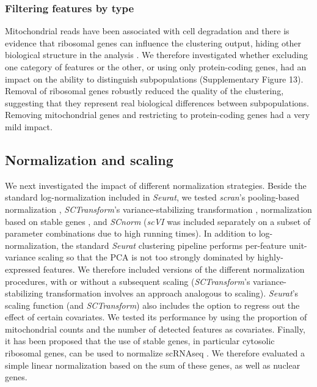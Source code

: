 \documentclass{bmcart}
\begin{document}
\subsubsection*{Filtering features by type}

Mitochondrial reads have been associated with cell degradation and there is evidence that ribosomal genes can influence the clustering output, hiding other biological structure in the analysis \cite{freytagComparison2018}. We therefore investigated whether excluding one category of features or the other, or using only protein-coding genes, had an impact on the ability to distinguish subpopulations (Supplementary Figure 13). Removal of ribosomal genes robustly reduced the quality of the clustering, suggesting that they represent real biological differences between subpopulations. Removing mitochondrial genes and restricting to protein-coding genes had a very mild impact.

\subsection*{Normalization and scaling}

We next investigated the impact of different normalization strategies. Beside the standard log-normalization included in \textit{Seurat}, we tested \textit{scran}'s pooling-based normalization \cite{lunPooling2016}, \textit{SCTransform}'s variance-stabilizing transformation \cite{hafemeisterSCtransform2019}, normalization based on stable genes \cite{linStableGenes2018, deekeStablyExpressed2018}, and \textit{SCnorm} \cite{bacherSCnorm2017} (\textit{scVI} \cite{lopezDeep2018} was included separately on a subset of parameter combinations due to high running times). In addition to log-normalization, the standard \textit{Seurat} clustering pipeline performs per-feature unit-variance scaling so that the PCA is not too strongly dominated by highly-expressed features. We therefore included versions of the different normalization procedures, with or without a subsequent scaling (\textit{SCTransform}'s variance-stabilizing transformation involves an approach analogous to scaling). 
\textit{Seurat}'s scaling function (and \textit{SCTransform}) also includes the option to regress out the effect of certain covariates. We tested its performance by using the proportion of mitochondrial counts and the number of detected features as covariates. Finally, it has been proposed that the use of stable genes, in particular cytosolic ribosomal genes, can be used to normalize scRNAseq \cite{deekeStablyExpressed2018}. We therefore evaluated a simple linear normalization based on the sum of these genes, as well as nuclear genes.
\end{document}
